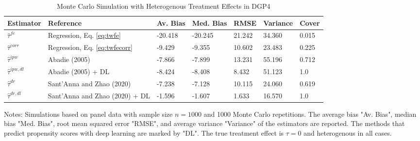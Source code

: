 \begin{table}[]
\centering
\begin{threeparttable}
\caption{Monte Carlo Simulation with Heterogenous Treatment Effects in DGP4}
\label{tab:table2}
\begin{tabular}{lllllll}
\toprule
\hline
\addlinespace
Estimator         & Reference                         & Av. Bias   & Med. Bias   & RMSE & Variance & Cover \\ \midrule
\addlinespace
$\hat{\tau}^{fe}$ & Regression, Eq. \eqref{eq:twfe}               & -20.418      & -20.245        & 21.242 & 34.360  &0.015   \\
$\hat{\tau}^{corr}$ & Regression, Eq. \eqref{eq:twfecorr}           & -9.429      & -9.355       & 10.602 & 23.483  &0.225  \\
$\hat{\tau}^{ipw}$ & Abadie (2005)                    & -7.866       & -7.899       & 13.231 & 55.196   &0.712  \\
$\hat{\tau}^{ipw,dl}$ & Abadie (2005) + DL            & -8.424       & -8.408        & 8.432 & 51.123   &1.0   \\
$\hat{\tau}^{dr}$ & Sant'Anna and Zhao (2020)         & -7.238      & -7.128        & 10.115 & 24.060   & 0.619   \\
$\hat{\tau}^{dr,dl}$ & Sant'Anna and Zhao (2020) + DL & -1.596       & -1.607        & 1.633 & 16.570   & 1.0  \\

\bottomrule
\end{tabular}
\begin{tablenotes}
    \item Notes: Simulations based on panel data with sample size $n = 1000$ and 1000 Monte Carlo repetitions. The average bias "Av. Bias", median bias "Med. Bias", root mean squared error "RMSE", and average variance "Variance" of the estimators are reported. The methods that predict propensity scores with deep learning are marked by "DL". The true treatment effect is $\tau = 0$ and heterogenous in all cases.
\end{tablenotes}
\end{threeparttable}
\end{table}
